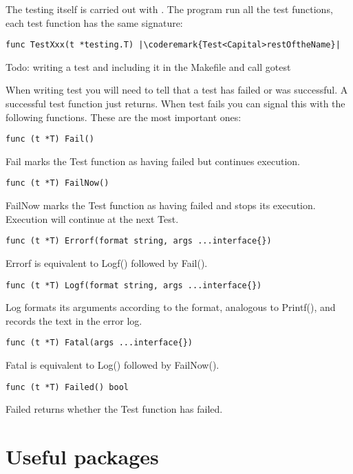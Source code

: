 The testing itself is carried out with .
The  program run all the test functions, each
test function has the same signature:
\begin{lstlisting}
func TestXxx(t *testing.T) |\coderemark{Test<Capital>restOftheName}|
\end{lstlisting}

Todo: writing a test and including it in the Makefile and call gotest

When writing test you will need to tell  that a test has failed or was successful. A
successful test function just returns. When test fails you can signal this with the following
functions\cite{go_doc}. These are the most important ones:

\begin{lstlisting}[numbers=none]
func (t *T) Fail()
\end{lstlisting}
Fail marks the Test function as having failed but continues execution.

\begin{lstlisting}[numbers=none]
func (t *T) FailNow()
\end{lstlisting}
FailNow marks the Test function as having failed and stops its execution.
Execution will continue at the next Test.

\begin{lstlisting}[numbers=none]
func (t *T) Errorf(format string, args ...interface{})
\end{lstlisting}
Errorf is equivalent to Logf() followed by Fail().

\begin{lstlisting}[numbers=none]
func (t *T) Logf(format string, args ...interface{})
\end{lstlisting}
Log formats its arguments according to the format, analogous to Printf(),
and records the text in the error log.

\begin{lstlisting}[numbers=none]
func (t *T) Fatal(args ...interface{})
\end{lstlisting}
Fatal is equivalent to Log() followed by FailNow().


\begin{lstlisting}[numbers=none]
func (t *T) Failed() bool
\end{lstlisting}
Failed returns whether the Test function has failed.




\section{Useful packages}




